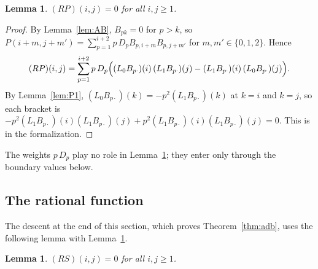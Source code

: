 \documentclass[11pt]{amsart}
\newtheorem{lemma}[theorem]{Lemma}
\theoremstyle{definition}
\numberwithin{equation}{section}
\newcommand{\lean}[1]{\ignorespaces}
\begin{document}
\begin{lemma}\label{lem:RV}\lean{CalegariSlopes.ADB.RV_zero}
$(RP)(i,j)=0$ for all $i,j\ge1$.
\end{lemma}

\begin{proof}
By Lemma~\ref{lem:AB}, $B_{pk}=0$ for $p>k$, so $P(i+m,j+m')=\sum_{p=1}^{i+2}p\,D_pB_{p,i+m}B_{p,j+m'}$ for $m,m'\in\{0,1,2\}$. Hence
\[
(RP)(i,j)=\sum_{p=1}^{i+2}p\,D_p\Bigl((L_0B_{p\cdot})(i)\,(L_1B_{p\cdot})(j)-(L_1B_{p\cdot})(i)\,(L_0B_{p\cdot})(j)\Bigr).
\]
By Lemma~\ref{lem:P1}, $(L_0B_{p\cdot})(k)=-p^2(L_1B_{p\cdot})(k)$ at $k=i$ and $k=j$, so each bracket is $-p^2(L_1B_{p\cdot})(i)(L_1B_{p\cdot})(j)+p^2(L_1B_{p\cdot})(i)(L_1B_{p\cdot})(j)=0$. This is  in the formalization.
\end{proof}

The weights $p\,D_p$ play no role in Lemma~\ref{lem:RV}; they enter only through the boundary values below.

\subsection{The rational function}
The descent at the end of this section, which proves Theorem~\ref{thm:adb}, uses the following lemma with Lemma~\ref{lem:RV}.

\begin{lemma}\label{lem:RS}\lean{CalegariSlopes.ADB.RS_zero, CalegariSlopes.ADB.Proof.Hhat_G_eq_zero}
$(RS)(i,j)=0$ for all $i,j\ge1$.
\end{lemma}
\end{document}
